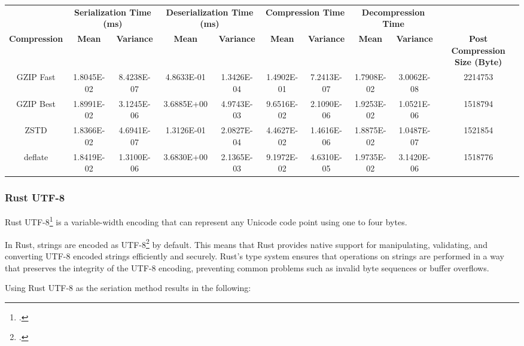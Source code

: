 \begin{table}[h]
\centering
\begin{tabular}{cccccccccc}
\hline
 &
  \multicolumn{2}{c}{\textbf{Serialization Time (ms)}} &
  \multicolumn{2}{c}{\textbf{Deserialization Time (ms)}} &
  \multicolumn{2}{c}{\textbf{Compression Time}} &
  \multicolumn{2}{c}{\textbf{Decompression Time}} &
   \\
\textbf{Compression} & \textbf{Mean}     & \textbf{Variance} & \textbf{Mean}     & \textbf{Variance} & \textbf{Mean}     & \textbf{Variance} & \textbf{Mean}     & \textbf{Variance} & \textbf{Post Compression Size (Byte)} \\
\hline
GZIP Fast           & 1.8045E-02 & 8.4238E-07 & 4.8633E-01 & 1.3426E-04 & 1.4902E-01 & 7.2413E-07 & 1.7908E-02 & 3.0062E-08 & 2214753 \\
GZIP Best           & 1.8991E-02 & 3.1245E-06 & 3.6885E+00 & 4.9743E-03 & 9.6516E-02 & 2.1090E-06 & 1.9253E-02 & 1.0521E-06 & 1518794 \\
ZSTD                & 1.8366E-02 & 4.6941E-07 & 1.3126E-01 & 2.0827E-04 & 4.4627E-02 & 1.4616E-06 & 1.8875E-02 & 1.0487E-07 & 1521854 \\
deflate             & 1.8419E-02 & 1.3100E-06 & 3.6830E+00 & 2.1365E-03 & 9.1972E-02 & 4.6310E-05 & 1.9735E-02 & 3.1420E-06 & 1518776 \\
\hline
\end{tabular}
\end{table}

\subsubsection{Rust UTF-8}
Rust UTF-8\footcite{rust_utf8} is a variable-width encoding that can represent any Unicode code point using one to four bytes.

In Rust, strings are encoded as UTF-8\footcite{utf8} by default. This means that Rust provides native support for manipulating, validating, and converting UTF-8 encoded strings efficiently and securely. Rust's type system ensures that operations on strings are performed in a way that preserves the integrity of the UTF-8 encoding, preventing common problems such as invalid byte sequences or buffer overflows.

Using Rust UTF-8 as the seriation method results in the following:

